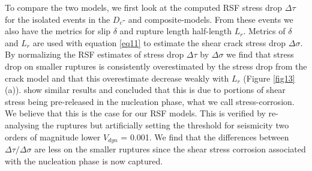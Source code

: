 \documentclass[draft]{agujournal2019}
\begin{document}
To compare the two models, we first look at the computed RSF stress drop $\Delta\tau$ for the isolated events in the $D_{c}$- and composite-models. From these events we also have the metrics for slip $\delta$ and rupture length half-length $L_{r}$. Metrics of $\delta$ and $L_{r}$ are used with equation \eqref{eq11} to estimate the shear crack stress drop $\Delta\sigma$. By normalizing the RSF estimates of stress drop $\Delta\tau$ by $\Delta\sigma$ we find that stress drop on smaller ruptures is consistently overestimated by the stress drop from the crack model and that this overestimate decrease weakly with $L_{r}$ (Figure \ref{fig13}(a)).  show similar results and concluded that this is due to portions of shear stress being pre-released in the nucleation phase, what we call stress-corrosion. We believe that this is the case for our RSF models.  This is verified by re-analysing the ruptures but artificially setting the threshold for seismicity two orders of magnitude lower $V_{dyn}$ = 0.001.  We find that the differences between $\Delta\tau/\Delta\sigma$ are less on the smaller ruptures since the shear stress corrosion associated with the nucleation phase is now captured.
\end{document}
